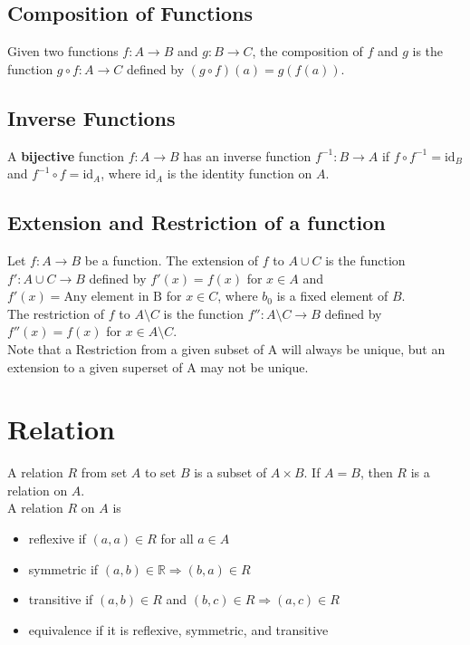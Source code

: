 \documentclass[12pt,a4paper,oneside]{report}
\theoremstyle{definition}
\begin{document}
\subsection{Composition of Functions}
Given two functions $f: A \rightarrow B$ and $g: B \rightarrow C$, the composition of $f$ and $g$ is the function $g \circ f: A \rightarrow C$ defined by $(g \circ f)(a) = g(f(a))$.
\subsection{Inverse Functions}
A \textbf{bijective} function $f: A \rightarrow B$ has an inverse function $f^{-1}: B \rightarrow A$ if $f \circ f^{-1} = \text{id}_B$ and $f^{-1} \circ f = \text{id}_A$, where $\text{id}_A$ is the identity function on $A$. 
\subsection{Extension and Restriction of a function}
Let $f: A \rightarrow B$ be a function. The extension of $f$ to $A \cup C$ is the function $f': A \cup C \rightarrow B$ defined by $f'(x) = f(x)$ for $x \in A$ and $f'(x) = \text{Any element in B} $ for $x \in C$, where $b_0$ is a fixed element of $B$. \\The restriction of $f$ to $A \setminus C$ is the function $f'': A \setminus C \rightarrow B$ defined by $f''(x) = f(x)$ for $x \in A \setminus C$.
\\Note that a Restriction from a given subset of A will always be unique, but an extension to a given superset of A may not be unique.
\section{Relation}
A relation $R$ from set $A$ to set $B$ is a subset of $A \times B$. If $A = B$, then $R$ is a relation on $A$. 
\\A relation $R$ on $A$ is 
\begin{itemize}
\item reflexive if $(a, a) \in R$ for all $a \in A$
\item symmetric if $(a, b) \in \mathbb{R} \Rightarrow (b, a) \in R$
\item transitive if $(a, b) \in R$ and $(b, c) \in R \Rightarrow (a, c) \in R$
\item equivalence if it is reflexive, symmetric, and transitive
\end{itemize}
\end{document}
